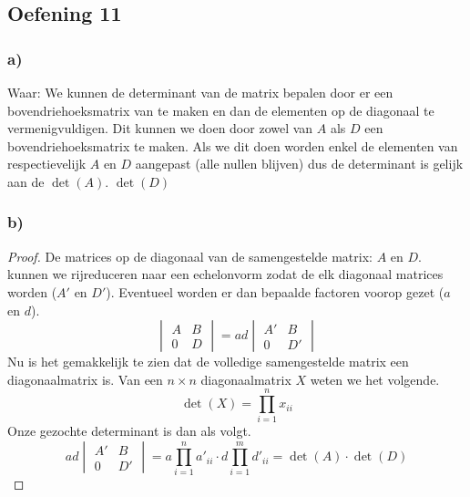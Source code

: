 \documentclass[lineaire_algebra_oplossingen.tex]{subfiles}
\begin{document}
\subsection{Oefening 11}
\subsubsection*{a)}
Waar: We kunnen de determinant van de matrix bepalen door er een bovendriehoeksmatrix van te maken en dan de elementen op de diagonaal te vermenigvuldigen. Dit kunnen we doen door zowel van $A$ als $D$ een bovendriehoeksmatrix te maken. Als we dit doen worden enkel de elementen van respectievelijk $A$ en $D$ aangepast (alle nullen blijven) dus de determinant is gelijk aan de $\det(A)$. $\det(D)$

\subsubsection*{b)}
\begin{proof}
De matrices op de diagonaal van de samengestelde matrix: $A$ en $D$. kunnen we rijreduceren naar een echelonvorm zodat de elk diagonaal matrices worden ($A'$ en $D'$). Eventueel worden er dan bepaalde factoren voorop gezet ($a$ en $d$).
\[
\begin{vmatrix}
A & B\\
0 & D
\end{vmatrix}
=
ad
\begin{vmatrix}
A' & B\\
0 & D'
\end{vmatrix}
\]
Nu is het gemakkelijk te zien dat de volledige samengestelde matrix een diagonaalmatrix is.
Van een $n\times n$ diagonaalmatrix $X$ weten we het volgende.
\[
\det \left({X}\right) = \prod_{i \mathop = 1}^n x_{ii}
\]
Onze gezochte determinant is dan als volgt.
\[
ad
\begin{vmatrix}
A' & B\\
0 & D'
\end{vmatrix} = a\prod_{i \mathop = 1}^n a'_{ii} \cdot d \prod_{i \mathop = 1}^m d'_{ii} = \det \left({A}\right)\cdot\det \left({D}\right)
\]
\end{proof}
\end{document}
